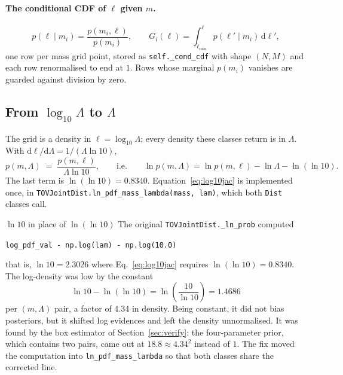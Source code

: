 \documentclass[11pt,a4paper]{article}
\newcommand{\dd}{\mathrm{d}}
\newcommand{\code}[1]{\texttt{#1}}
\begin{document}
\paragraph{The conditional CDF of $\ell$ given $m$.}
\begin{equation}
  p(\ell \mid m_i) = \frac{p(m_i,\ell)}{p(m_i)},
  \qquad
  G_i(\ell) = \int_{\ell_{\min}}^{\ell} p(\ell' \mid m_i)\,\dd\ell' ,
  \label{eq:condcdf}
\end{equation}
one row per mass grid point, stored as \code{self.\_cond\_cdf} with shape
$(N, M)$ and each row renormalised to end at $1$. Rows whose marginal
$p(m_i)$ vanishes are guarded against division by zero.

\subsection{From $\log_{10}\Lambda$ to $\Lambda$}
\label{sec:log10jac}

The grid is a density in $\ell = \log_{10}\Lambda$; every density these classes
return is in $\Lambda$. With $\dd\ell/\dd\Lambda = 1/(\Lambda \ln 10)$,
\begin{equation}
  p(m, \Lambda) \;=\; \frac{p(m, \ell)}{\Lambda \ln 10},
  \qquad\text{i.e.}\qquad
  \ln p(m,\Lambda) = \ln p(m,\ell) - \ln \Lambda - \ln(\ln 10).
  \label{eq:log10jac}
\end{equation}
The last term is $\ln(\ln 10) = 0.8340$. Equation~\eqref{eq:log10jac} is
implemented once, in \code{TOVJointDist.ln\_pdf\_mass\_lambda(mass, lam)}, which
both \code{Dist} classes call.

\begin{bugnote}{$\ln 10$ in place of $\ln(\ln 10)$}
The original \code{TOVJointDist.\_ln\_prob} computed
\begin{center}
\code{log\_pdf\_val - np.log(lam) - np.log(10.0)}
\end{center}
that is, $\ln 10 = 2.3026$ where Eq.~\eqref{eq:log10jac} requires
$\ln(\ln 10) = 0.8340$. The log-density was low by the constant
\begin{equation*}
  \ln 10 - \ln(\ln 10) = \ln\!\left( \frac{10}{\ln 10} \right) = 1.4686
\end{equation*}
per $(m, \Lambda)$ pair, a factor of $4.34$ in density. Being constant, it
did not bias posteriors, but it shifted log evidences and left the density
unnormalised. It was found by the box estimator of Section~\ref{sec:verify}:
the four-parameter prior, which contains two pairs, came out at
$18.8 \approx 4.34^2$ instead of $1$. The fix moved the computation into
\code{ln\_pdf\_mass\_lambda} so that both classes share the corrected line.
\end{bugnote}
\end{document}
